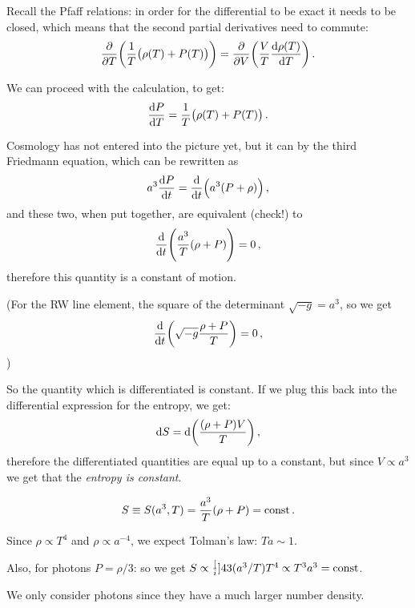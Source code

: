 \documentclass[main.tex]{subfiles}
\begin{document}
Recall the Pfaff relations: in order for the differential to be exact it needs to be closed, which means that the second partial derivatives need to commute: 
%
\begin{equation}
  \pdv{}{T}  \qty(\frac{1}{T}\qty(\rho (T) + P(T))) 
  = \pdv{}{V} \qty(\frac{V}{T} \dv{\rho (T)}{T} ) 
\,.
\end{equation}

We can proceed with the calculation, to get: 
%
\begin{equation}
  \dv{P}{T} = \frac{1}{T} \qty(\rho (T ) + P(T))
\,.
\end{equation}
%

Cosmology has not entered into the picture yet, but it can by the third Friedmann equation, which can be rewritten as 
%
\begin{equation}
  a^3 \dv{P}{t} =\dv{}{t} \qty(a^3 (P + \rho ))
\,,
\end{equation}
%
and these two, when put together, are equivalent (check!) to 
%
\begin{equation}
  \dv{}{t} \qty(\frac{a^3}{T} (\rho + P ))=0
\,,
\end{equation}
%
therefore this quantity is a constant of motion. 


(For the RW line element, the square of the determinant \(\sqrt{-g} =  a^3 \), so we get 
%
\begin{equation}
  \dv{}{t} \qty(\sqrt{-g }  \frac{\rho + P}{T}) = 0
\,,
\end{equation}
)

So the quantity which is differentiated is constant. If we plug this back into the differential expression for the entropy, we get: 
%
\begin{equation}
  \dd{S} = \dd \qty(\frac{(\rho + P) V}{T})
\,,
\end{equation}
%
therefore the differentiated quantities are equal up to a constant, but since \(V \propto a^3\) we get that the \emph{entropy is constant}.

\begin{equation}
  S \equiv S(a^3, T) 
  = \frac{a^3}{T} \qty(\rho + P)
  = \text{const}
\,.
\end{equation}

Since \(\rho \propto T^{4}\) and \(\rho \propto a^{-4}\), we expect Tolman's law: \(Ta \sim 1\).

Also, for photons \(P  = \rho / 3\): so we get \(S \propto \frac[i]{4}{3} (a^3/T) T^{4} \propto T^3 a^3 = \text{const}\).

We only consider photons since they have a much larger number density.
\end{document}
